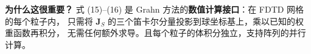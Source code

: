 \begin{chaptersummary}
\textbf{为什么这很重要？}
式 (15)--(16) 是 Grahn 方法的\textbf{数值计算接口}：在 FDTD 网格的每个粒子内，
只需将 $\mathbf{J}_S$ 的三个笛卡尔分量投影到球坐标基上，乘以已知的权重函数再积分，
无需任何额外求导。且每个粒子的体积分独立，支持阵列的并行计算。

\end{chaptersummary}

\newpage

